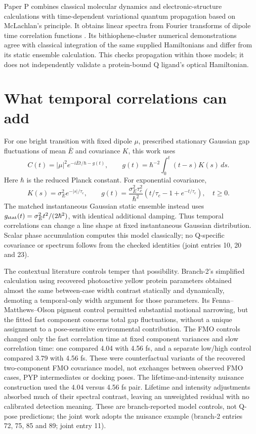 \documentclass{article}
\begin{document}
Paper P combines classical molecular dynamics and electronic-structure calculations with time-dependent variational quantum propagation based on McLachlan's principle. It obtains linear spectra from Fourier transforms of dipole time correlation functions \cite{P}. Its bithiophene-cluster numerical demonstrations agree with classical integration of the same supplied Hamiltonians and differ from its static ensemble calculation. This checks propagation within those models; it does not independently validate a protein-bound Q ligand's optical Hamiltonian.

\section{What temporal correlations can add}

For one bright transition with fixed dipole \(\mu\), prescribed stationary Gaussian gap fluctuations of mean \(\bar E\) and covariance \(K\), this work uses
\[
 C(t)=|\mu|^2e^{-i\bar E t/\hbar-g(t)},\qquad
 g(t)=\hbar^{-2}\int_0^t(t-s)K(s)\,ds.
\]
Here \(\hbar\) is the reduced Planck constant. For exponential covariance,
\[
 K(s)=\sigma_E^2e^{-|s|/\tau_c},\qquad
 g(t)=\frac{\sigma_E^2\tau_c^2}{\hbar^2}
 \left(t/\tau_c-1+e^{-t/\tau_c}\right),\quad t\geq0.
\]
The matched instantaneous Gaussian static ensemble instead uses \(g_{\rm stat}(t)=\sigma_E^2t^2/(2\hbar^2)\), with identical additional damping. Thus temporal correlations can change a line shape at fixed instantaneous Gaussian distribution. Scalar phase accumulation computes this model classically; no Q-specific covariance or spectrum follows from the checked identities (joint entries 10, 20 and 23).

The contextual literature controls temper that possibility. Branch-2's simplified calculation using recovered photoactive yellow protein parameters obtained almost the same between-case width contrast statically and dynamically, demoting a temporal-only width argument for those parameters. Its Fenna--Matthews--Olson pigment control permitted substantial motional narrowing, but the fitted fast component concerns total gap fluctuations, without a unique assignment to a pose-sensitive environmental contribution. The FMO controls changed only the fast correlation time at fixed component variances and slow correlation time: one compared 4.04 with 4.56 fs, and a separate low/high control compared 3.79 with 4.56 fs. These were counterfactual variants of the recovered two-component FMO covariance model, not exchanges between observed FMO cases, PYP intermediates or docking poses. The lifetime-and-intensity nuisance construction used the 4.04 versus 4.56 fs pair. Lifetime and intensity adjustments absorbed much of their spectral contrast, leaving an unweighted residual with no calibrated detection meaning. These are branch-reported model controls, not Q-pose predictions; the joint work adopts the nuisance example (branch-2 entries 72, 75, 85 and 89; joint entry 11).
\end{document}
